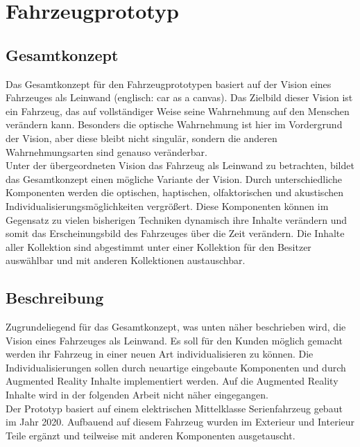 \chapter{Fahrzeugprototyp}
\label{cha:Prototyp}
\section{Gesamtkonzept}
Das Gesamtkonzept für den Fahrzeugprototypen basiert auf der Vision eines Fahrzeuges als Leinwand (englisch: car as a canvas). Das Zielbild dieser Vision ist ein Fahrzeug, das auf vollständiger Weise seine Wahrnehmung auf den Menschen verändern kann. Besonders die optische Wahrnehmung ist hier im Vordergrund der Vision, aber diese bleibt nicht singulär, sondern die anderen Wahrnehmungsarten sind genauso veränderbar.\\

Unter der übergeordneten Vision das Fahrzeug als Leinwand zu betrachten, bildet das Gesamtkonzept einen mögliche Variante der Vision. 
Durch unterschiedliche Komponenten werden die optischen, haptischen, olfaktorischen und akustischen Individualisierungsmöglichkeiten vergrößert. Diese Komponenten können im Gegensatz zu vielen bisherigen Techniken dynamisch ihre Inhalte verändern und somit das Erscheinungsbild des Fahrzeuges über die Zeit verändern. Die Inhalte aller Kollektion sind abgestimmt unter einer Kollektion für den Besitzer auswählbar und mit anderen Kollektionen austauschbar.
\section{Beschreibung}
Zugrundeliegend für das Gesamtkonzept, was unten näher beschrieben wird, die Vision eines Fahrzeuges als Leinwand. Es soll für den Kunden möglich gemacht werden ihr Fahrzeug in einer neuen Art individualisieren zu können. Die Individualisierungen sollen durch neuartige eingebaute Komponenten und durch Augmented Reality Inhalte implementiert werden. Auf die Augmented Reality Inhalte wird in der folgenden Arbeit nicht näher eingegangen.\\
Der Prototyp basiert auf einem elektrischen Mittelklasse Serienfahrzeug gebaut im Jahr 2020. Aufbauend auf diesem Fahrzeug wurden im Exterieur und Interieur Teile ergänzt und teilweise mit anderen Komponenten ausgetauscht.

